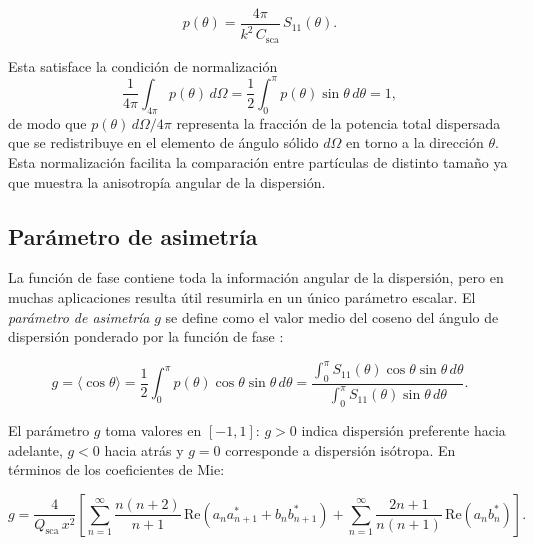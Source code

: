 \begin{equation}
  p(\theta) = \frac{4\pi}{k^2\,C_{\text{sca}}}\,S_{11}(\theta).
\end{equation}

Esta satisface la condición de normalización
\begin{equation}
  \frac{1}{4\pi}\int_{4\pi} p(\theta)\,d\Omega
  = \frac{1}{2}\int_0^{\pi} p(\theta)\sin\theta\,d\theta = 1,
\end{equation}
de modo que $p(\theta)\,d\Omega/4\pi$ representa la fracción de la potencia
total dispersada que se redistribuye en el elemento de ángulo sólido $d\Omega$
en torno a la dirección $\theta$. Esta normalización facilita la comparación
entre partículas de distinto tamaño ya que muestra la anisotropía angular 
de la dispersión.

\subsection{Parámetro de asimetría}

La función de fase contiene toda la información angular de la dispersión, pero
en muchas aplicaciones resulta útil resumirla en un único parámetro escalar. El
\textit{parámetro de asimetría} $g$ se define como el valor medio del coseno del
ángulo de dispersión ponderado por la función de fase \cite[p.~120]{Bohren1983}
\cite[cap.~2]{Mishchenko2002}:

\begin{equation}
  \label{eq:g_mie}
  g = \langle\cos\theta\rangle
    = \frac{1}{2}\int_0^{\pi} p(\theta)\cos\theta\sin\theta\,d\theta
    = \frac{\displaystyle\int_0^\pi S_{11}(\theta)\cos\theta\sin\theta\,d\theta}
           {\displaystyle\int_0^\pi S_{11}(\theta)\sin\theta\,d\theta}.
\end{equation}

El parámetro $g$ toma valores en $[-1, 1]$: $g > 0$ indica dispersión
preferente hacia adelante, $g < 0$ hacia atrás y $g = 0$ corresponde a
dispersión isótropa. En términos de los coeficientes de Mie:

\begin{equation}
  g = \frac{4}{Q_{\text{sca}}\,x^2}
  \left[
    \sum_{n=1}^{\infty}
    \frac{n(n+2)}{n+1}\,\mathrm{Re}(a_n a_{n+1}^* + b_n b_{n+1}^*)
    +
    \sum_{n=1}^{\infty}
    \frac{2n+1}{n(n+1)}\,\mathrm{Re}(a_n b_n^*)
  \right].
\end{equation}

